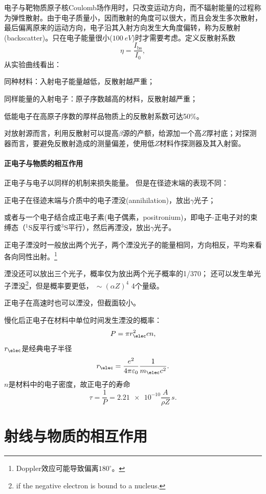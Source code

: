 电子与靶物质原子核Coulomb场作用时，只改变运动方向，而不辐射能量的过程称为弹性散射。由于电子质量小，因而散射的角度可以很大，而且会发生多次散射，最后偏离原来的运动方向，电子沿其入射方向发生大角度偏转，称为反散射(backscatter)。只在电子能量很小($\SI{100}{eV}$)时才需要考虑。定义反散射系数
\[
	\eta=\frac{I_{\mathrm{bs}}}{I_0},
\]
从实验曲线看出：
\begin{compactenum}
	\item 同种材料：入射电子能量越低，反散射越严重；
	\item 同样能量的入射电子：原子序数越高的材料，反散射越严重；
	\item 低能电子在高原子序数的厚样品物质上的反散射系数可达50\%。
\end{compactenum}
对放射源而言，利用反散射可以提高$\beta$源的产额，给源加一个高$Z$厚衬底；对探测器而言，要避免反散射造成的测量偏差，使用低$Z$材料作探测器及其入射窗。
\paragraph{正电子与物质的相互作用}
正电子与电子以同样的机制来损失能量。
但是在径迹末端的表现不同：
\begin{compactitem}
	\item 正电子在径迹末端与介质中的电子湮没(annihilation)，放出$\gamma$光子；
	\item 或者与一个电子结合成正电子素(电子偶素，positronium)，即电子-正电子对的束缚态（$^1$S反平行或$^3$S平行），然后再湮没，放出$\gamma$光子。
\end{compactitem}

正电子湮没时一般放出两个光子，两个湮没光子的能量相同，方向相反，平均来看各向同性出射。\footnote{Doppler效应可能导致偏离$180^\circ$。}

湮没还可以放出三个光子，概率仅为放出两个光子概率的1/370；
还可以发生单光子湮没\footnote{if the negative electron is bound to a nucleus.}，但是概率要更低，$~\sim(\alpha Z)^4$ 4个量级。

正电子在高速时也可以湮没，但截面较小。

慢化后正电子在材料中单位时间发生湮没的概率：
\[
	P=\pi r_\elec^2cn,
\]
$r_\elec$是经典电子半径
\[
	r_\elec=\frac{e^2}{4\pi\varepsilon_0}\frac1{m_\elec c^2}.
\]
$n$是材料中的电子密度，故正电子的寿命
\[
	\tau=\frac1P=\num{2.21e-10}\frac{A}{\rho Z}\,\si{s}.
\]

\section{\textgamma 射线与物质的相互作用}

